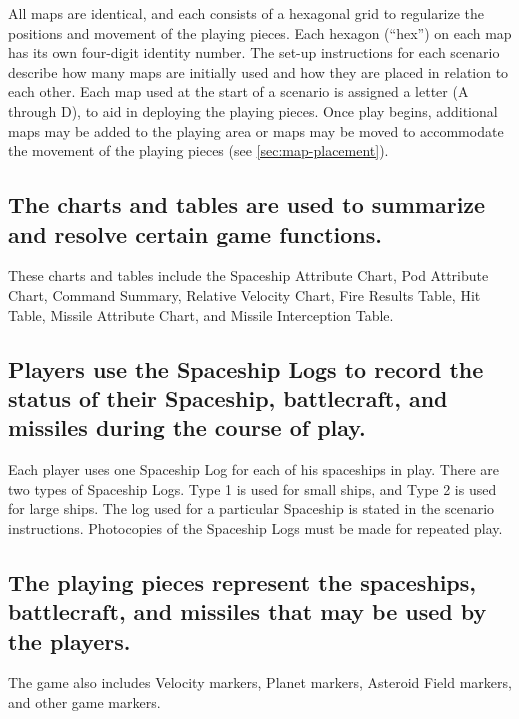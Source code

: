 All maps are identical, and each consists of a hexagonal grid to
regularize the positions and movement of the playing pieces. Each
hexagon (``hex'') on each map has its own four-digit identity number.
The set-up instructions for each scenario describe how many maps are
initially used and how they are placed in relation to each other. Each
map used at the start of a scenario is assigned a letter (A through
D), to aid in deploying the playing pieces. Once play begins,
additional maps may be added to the playing area or maps may be moved
to accommodate the movement of the playing pieces (see
\ref{sec:map-placement}).



\subsection[Charts And Tables]{The charts and tables are used to
  summarize and resolve 
  certain game functions.}
\label{sec:charts-tables}



These charts and tables include the Spaceship Attribute Chart, Pod
Attribute Chart, Command Summary, Relative Velocity Chart, Fire
Results Table, Hit Table, Missile Attribute Chart, and Missile
Interception Table.



\subsection[Spaceship Logs]{Players use the Spaceship Logs to record
  the status of their Spaceship, battlecraft, and missiles during  
  the course of play.}
\label{sec:spacecraft-logs}


Each player uses one Spaceship Log for each of his spaceships in
play. There are two types of Spaceship Logs. Type 1 is used for small
ships, and Type 2 is used for large ships. The log used for a
particular Spaceship is stated in the scenario instructions.
Photocopies of the Spaceship Logs must be made for repeated play.


\subsection[Playing Pieces]{The playing pieces represent the
  spaceships, battlecraft, 
  and missiles that may be used by the players.}
\label{sec:playing-pieces}


The game also includes Velocity markers, Planet markers, Asteroid
Field markers, and other game markers.


